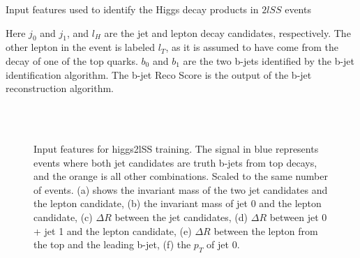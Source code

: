 \begin{table}[H]

\caption{Input features used to identify the Higgs decay products in $2lSS$ events}
\label{tab:higgsTop2lSSfeatures}
\end{table}

Here $j_0$ and $j_1$, and $l_H$ are the jet and lepton decay candidates, respectively. The other lepton in the event is labeled $l_T$, as it is assumed to have come from the decay of one of the top quarks. $b_0$ and $b_1$ are the two b-jets identified by the b-jet identification algorithm. The b-jet Reco Score is the output of the b-jet reconstruction algorithm.

\begin{figure}[H]
    \centering
    \\
    \\
    \caption{Input features for higgs2lSS training. The signal in blue represents events where both jet candidates are truth b-jets from top decays, and the orange is all other combinations. Scaled to the same number of events. (a) shows the invariant mass of the two jet candidates and the lepton candidate, (b) the invariant mass of jet 0 and the lepton candidate, (c) $\Delta R$ between the jet candidates, (d) $\Delta R$ between jet 0 + jet 1 and the lepton candidate, (e) $\Delta R$ between the lepton from the top and the leading b-jet, (f) the $p_T$ of jet 0.}
    \label{fig:features_higgs2lSS}
\end{figure}


